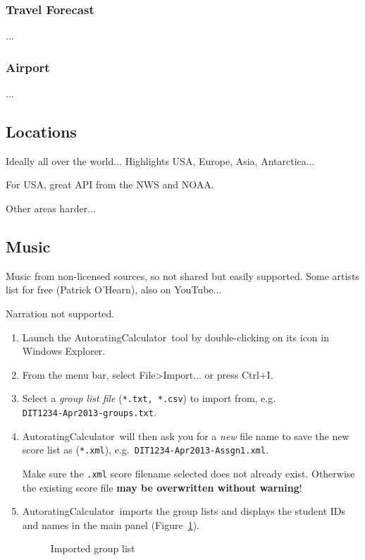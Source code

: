 \documentclass[a4paper,11pt]{refart}
\newcommand\AutoCalc{\textsf{AutoratingCalculator}}
\begin{document}
\subsubsection*{Travel Forecast}
...

\subsubsection*{Airport}
...



\subsection{Locations}

Ideally all over the world... Highlights USA, Europe, Asia, Antarctica...

For USA, great API from the NWS and NOAA.

Other areas harder...

\subsection{Music}

Music from non-licensed sources, so not shared but easily supported. Some artists list for free (Patrick O'Hearn), also on YouTube...

Narration not supported.


\begin{enumerate}
\item Launch the \AutoCalc\ tool by double-clicking on its icon in Windows Explorer.
\item From the menu bar, select File>Import... or press Ctrl+I.
\item Select a \emph{group list file} (\texttt{*.txt, *.csv}) to import from, e.g.\\\texttt{DIT1234-Apr2013-groups.txt}.
\item \AutoCalc\ will then ask you for a \emph{new} file name to save the new score list as (\texttt{*.xml}), e.g.~\texttt{DIT1234-Apr2013-Assgn1.xml}.


\medskip

\begin{leftbar}
Make sure the \texttt{.xml} score filename selected does not already exist. Otherwise the existing score file \textbf{may be overwritten without warning}!
\end{leftbar}

\medskip

\item \AutoCalc\ imports the group lists and displays the student IDs and names in the main panel (Figure~\ref{fig:grouplist}).

\begin{figure}[hbt!]\centering
\caption{Imported group list}\label{fig:grouplist}
\end{figure}
\end{enumerate}
\end{document}
